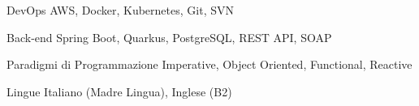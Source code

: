 

\begin{cvskills}

  \cvskill
    {DevOps} %
    {AWS, Docker, Kubernetes, Git, SVN} %

  \cvskill
    {Back-end} %
    {Spring Boot, Quarkus, PostgreSQL, REST API, SOAP} %

  \cvskill
    {Paradigmi di Programmazione} %
    {Imperative, Object Oriented, Functional, Reactive} %

  \cvskill
    {Lingue} %
    {Italiano (Madre Lingua), Inglese (B2)} %

\end{cvskills}
